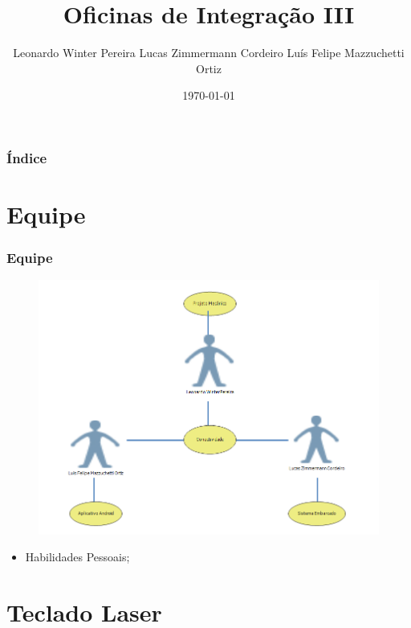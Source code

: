 \documentclass[hyperref={pdfpagelabels=false}]{beamer}
\title{Oficinas de Integração III}
\author{Leonardo Winter Pereira \newline Lucas Zimmermann Cordeiro \newline Luís Felipe Mazzuchetti Ortiz}
\date{\today}
\begin{document}
    \begin{frame}
        \titlepage
    \end{frame}

    \begin{frame}\frametitle{Índice}
        \tableofcontents
    \end{frame}

    \section{Equipe}

        \begin{frame}\frametitle{Equipe}

            \begin{figure}
                    \includegraphics[scale=0.3]{Imagens/Ideia_de_projeto/equipe.png}
            \end{figure}

            \begin{itemize}
                \item Habilidades Pessoais;
            \end{itemize}

        \end{frame}

    \section{Teclado Laser}
\end{document}
